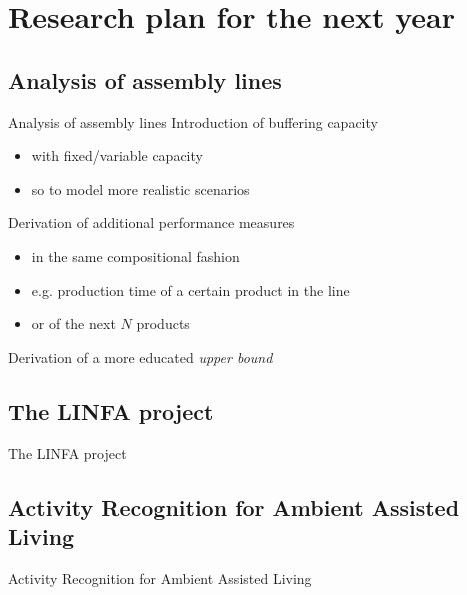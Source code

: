 
\section{Research plan for the next year}
  \subsection{Analysis of assembly lines}
    \begin{frame}{Analysis of assembly lines}
      Introduction of buffering capacity
      \begin{itemize}
        \item with fixed/variable capacity
        \item so to model more realistic scenarios
      \end{itemize}
      
      \vspace{1em}
      Derivation of additional performance measures
      \begin{itemize}
        \item in the same compositional fashion
        \item e.g. production time of a certain product in the line
        \item or of the next $N$ products
      \end{itemize}
      
      \vspace{1em}
      Derivation of a more educated \textit{upper bound}
    \end{frame}
    
  \subsection{The LINFA project}
    \begin{frame}{The LINFA project}
      
    \end{frame}
    
  \subsection{Activity Recognition for Ambient Assisted Living}
    \begin{frame}{Activity Recognition for Ambient Assisted Living}
      
    \end{frame}